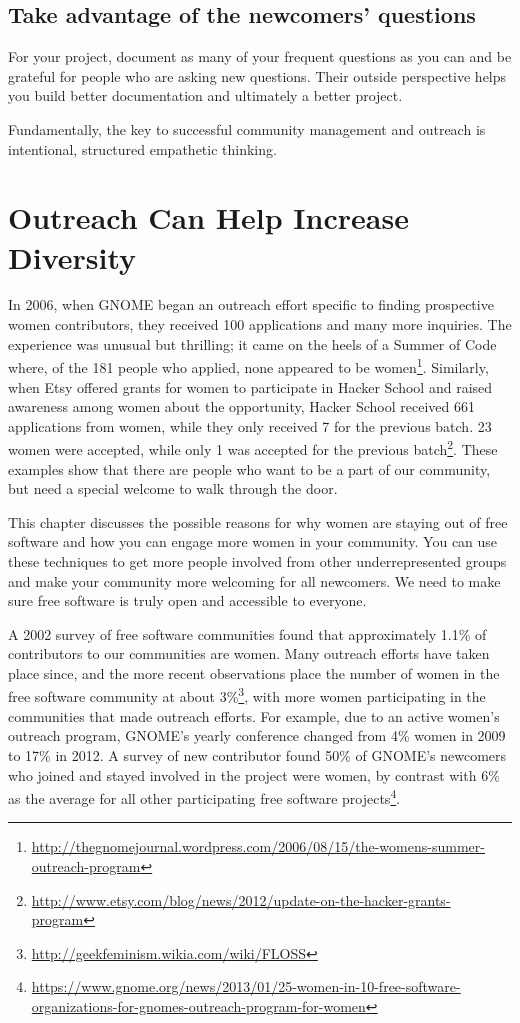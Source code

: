 \subsection{Take advantage of the newcomers’ questions}
For your project, document as many of your frequent questions as you can and be grateful for people who are asking new questions. Their outside perspective helps you build better documentation and ultimately a better project. 

Fundamentally, the key to successful community management and outreach is intentional, structured empathetic thinking.

\section{Outreach Can Help Increase Diversity}
In 2006, when GNOME began an outreach effort specific to finding prospective women contributors, they received 100 applications and many more inquiries. The experience was unusual but thrilling; it came on the heels of a Summer of Code where, of the 181 people who applied, none appeared to be women\footnote{\url{http://thegnomejournal.wordpress.com/2006/08/15/the-womens-summer-outreach-program}}. Similarly, when Etsy offered grants for women to participate in Hacker School and raised awareness among women about the opportunity, Hacker School received 661 applications from women, while they only received 7 for the previous batch. 23 women were accepted, while only 1 was accepted for the previous batch\footnote{\url{http://www.etsy.com/blog/news/2012/update-on-the-hacker-grants-program}}. These examples show that there are people who want to be a part of our community, but need a special welcome to walk through the door.

This chapter discusses the possible reasons for why women are staying out of free software and how you can engage more women in your community. You can use these techniques to get more people involved from other underrepresented groups and make your community more welcoming for all newcomers. We need to make sure free software is truly open and accessible to everyone.

A 2002 survey of free software communities found that approximately 1.1\% of contributors to our communities are women. Many outreach efforts have taken place since, and the more recent observations place the number of women in the free software community at about 3\%\footnote{\url{http://geekfeminism.wikia.com/wiki/FLOSS}}, with more women participating in the communities that made outreach efforts. For example, due to an active women’s outreach program, GNOME’s yearly conference changed from 4\% women in 2009 to 17\% in 2012. A survey of new contributor found 50\% of GNOME’s newcomers who joined and stayed involved in the project were women, by contrast with 6\% as the average for all other participating free software projects\footnote{\url{https://www.gnome.org/news/2013/01/25-women-in-10-free-software-organizations-for-gnomes-outreach-program-for-women}}.

